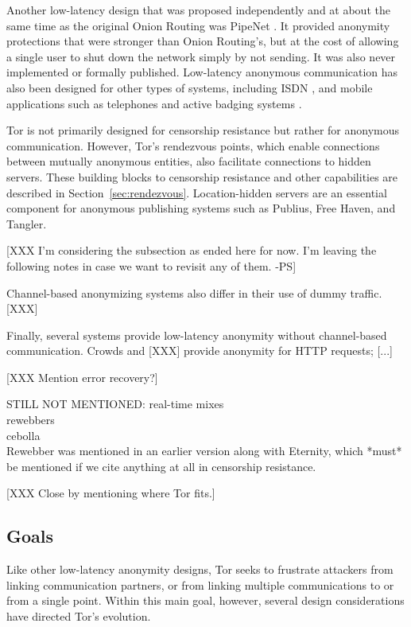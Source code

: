 \documentclass[times,10pt,twocolumn]{article}
\begin{document}
Another low-latency design that was proposed independently and at
about the same time as the original Onion Routing was PipeNet
\cite{pipenet}.  It provided anonymity protections that were stronger
than Onion Routing's, but at the cost of allowing a single user to
shut down the network simply by not sending. It was also never
implemented or formally published. Low-latency anonymous communication
has also been designed for other types of systems, including
ISDN \cite{isdn-mixes}, and mobile applications such as telephones and
active badging systems \cite{federrath-ih96,reed-protocols97}.

Tor is not primarily designed for censorship resistance but rather
for anonymous communication. However, Tor's rendezvous points, which
enable connections between mutually anonymous entities, also
facilitate connections to hidden servers.  These building blocks to
censorship resistance and other capabilities are described in
Section~\ref{sec:rendezvous}.  Location-hidden servers are an
essential component for anonymous publishing systems such as
Publius\cite{publius}, Free Haven\cite{freehaven-berk}, and
Tangler\cite{tangler}.

[XXX I'm considering the subsection as ended here for now. I'm leaving the
following notes in case we want to revisit any of them. -PS]

Channel-based anonymizing systems also differ in their use of dummy traffic.
[XXX]

Finally, several systems provide low-latency anonymity without channel-based
communication.  Crowds and [XXX] provide anonymity for HTTP requests; [...]

[XXX Mention error recovery?]

STILL NOT MENTIONED:
real-time mixes\\
rewebbers\\
cebolla\\

Rewebber was mentioned in an earlier version along with Eternity,
which *must* be mentioned if we cite anything at all
in censorship resistance.


[XXX Close by mentioning where Tor fits.]

\label{sec:assumptions}


\subsection{Goals}
Like other low-latency anonymity designs, Tor seeks to frustrate
attackers from linking communication partners, or from linking
multiple communications to or from a single point.  Within this
main goal, however, several design considerations have directed
Tor's evolution.
\end{document}
